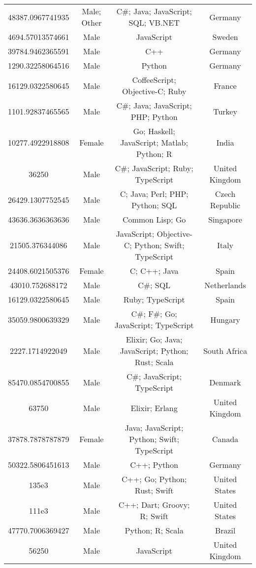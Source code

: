 \begin{center}
\begin{tabular}{ |c|c|c|c| }
48387.0967741935  &  Male; Other  &  C\#; Java; JavaScript; SQL; VB.NET  &  Germany  \\ 
4694.57013574661  &  Male  &  JavaScript  &  Sweden  \\ 
39784.9462365591  &  Male  &  C++  &  Germany  \\ 
1290.32258064516  &  Male  &  Python  &  Germany  \\ 
16129.0322580645  &  Male  &  CoffeeScript; Objective-C; Ruby  &  France  \\ 
1101.92837465565  &  Male  &  C\#; Java; JavaScript; PHP; Python  &  Turkey  \\ 
10277.4922918808  &  Female  &  Go; Haskell; JavaScript; Matlab; Python; R  &  India  \\ 
36250  &  Male  &  C\#; JavaScript; Ruby; TypeScript  &  United Kingdom  \\ 
26429.1307752545  &  Male  &  C; Java; Perl; PHP; Python; SQL  &  Czech Republic  \\ 
43636.3636363636  &  Male  &  Common Lisp; Go  &  Singapore  \\ 
21505.376344086  &  Male  &  JavaScript; Objective-C; Python; Swift; TypeScript  &  Italy  \\ 
24408.6021505376  &  Female  &  C; C++; Java  &  Spain  \\ 
43010.752688172  &  Male  &  C\#; SQL  &  Netherlands  \\ 
16129.0322580645  &  Male  &  Ruby; TypeScript  &  Spain  \\ 
35059.9800639329  &  Male  &  C\#; F\#; Go; JavaScript; TypeScript  &  Hungary  \\ 
2227.1714922049  &  Male  &  Elixir; Go; Java; JavaScript; Python; Rust; Scala  &  South Africa  \\ 
85470.0854700855  &  Male  &  C\#; JavaScript; TypeScript  &  Denmark  \\ 
63750  &  Male  &  Elixir; Erlang  &  United Kingdom  \\ 
37878.7878787879  &  Female  &  Java; JavaScript; Python; Swift; TypeScript  &  Canada  \\ 
50322.5806451613  &  Male  &  C++; Python  &  Germany  \\ 
135e3  &  Male  &  C++; Go; Python; Rust; Swift  &  United States  \\ 
111e3  &  Male  &  C++; Dart; Groovy; R; Swift  &  United States  \\ 
47770.7006369427  &  Male  &  Python; R; Scala  &  Brazil  \\ 
56250  &  Male  &  JavaScript  &  United Kingdom  \\ 

\end{tabular}
\end{center}
